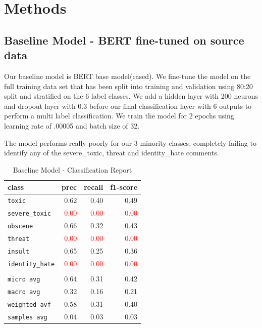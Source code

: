 \documentclass[11pt,a4paper]{article}
\begin{document}
\section{Methods}

\subsection{Baseline Model - BERT fine-tuned on source data}
Our baseline model is BERT base model(cased). We fine-tune the model on the full training data set that has been split into training and validation using 80:20 split and stratified on the 6 label classes. We add a hidden layer with 200 neurons and dropout layer with 0.3 before our final classification layer with 6 outputs to perform a multi label classification. We train the model for 2 epochs using learning rate of .00005 and batch size of 32.

The model performs really poorly for our 3 minority classes, completely failing to identify any of the severe\_toxic, threat and identity\_hate comments.

\begin{table}
\centering
\begin{tabular}{lrrr}
\hline
\textbf{class} & \textbf{prec} & \textbf{recall} & \textbf{f1-score}\\
\hline
\verb|toxic| & 0.62 & 0.40 & 0.49 \\
\verb|severe_toxic| & \textcolor{red}{0.00} & \textcolor{red}{0.00} & \textcolor{red}{0.00} \\
\verb|obscene| & 0.66 & 0.32 & 0.43 \\
\verb|threat| & \textcolor{red}{0.00} & \textcolor{red}{0.00} & \textcolor{red}{0.00} \\
\verb|insult| & 0.65 & 0.25 & 0.36 \\
\verb|identity_hate| & \textcolor{red}{0.00} & \textcolor{red}{0.00} & \textcolor{red}{0.00} \\
\vspace{2\baselineskip}\\
\verb|micro avg| & 0.64 & 0.31 & 0.42 \\
\verb|macro avg| & 0.32 & 0.16 & 0.21 \\
\verb|weighted avf| & 0.58 & 0.31 & 0.40 \\
\verb|samples avg| & 0.04 & 0.03 & 0.03 \\
\hline
\end{tabular}
\caption{Baseline Model - Classification Report}
\end{table}
\end{document}
